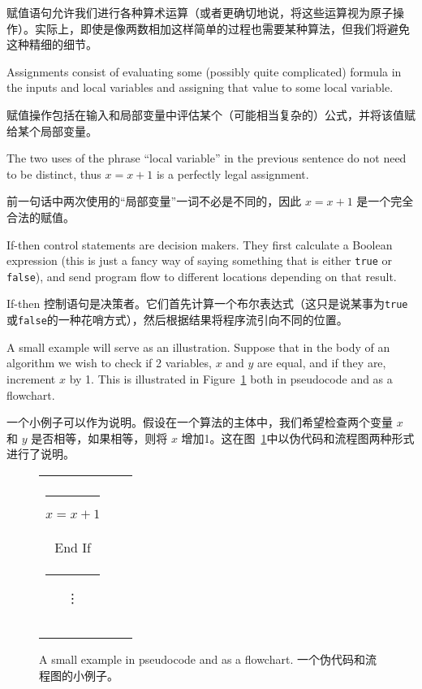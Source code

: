 赋值语句允许我们进行各种算术运算（或者更确切地说，将这些运算视为原子操作）。实际上，即使是像两数相加这样简单的过程也需要某种算法，但我们将避免这种精细的细节。

Assignments consist of evaluating some (possibly quite
complicated) formula in the inputs and local variables and assigning
that value to some local variable.

赋值操作包括在输入和局部变量中评估某个（可能相当复杂的）公式，并将该值赋给某个局部变量。

The two uses of the phrase ``local
variable''  in the previous sentence do not need to be distinct, thus
$x = x + 1$ is a perfectly legal assignment.

前一句话中两次使用的“局部变量”一词不必是不同的，因此 $x = x + 1$ 是一个完全合法的赋值。

If-then control statements are decision makers.  They first calculate
a Boolean expression (this is just a fancy way of saying something
that is either {\tt true} or {\tt false}), and send program flow to 
different locations depending on that result.

If-then 控制语句是决策者。它们首先计算一个布尔表达式（这只是说某事为{\tt true}或{\tt false}的一种花哨方式），然后根据结果将程序流引向不同的位置。

A small example will
serve as an illustration.  Suppose that in the body of an algorithm we
wish to check if 2 variables, $x$ and $y$ are equal, and if they are,
increment $x$ by 1.  This is illustrated in Figure~\ref{fig:if-then}
both in pseudocode and as a flowchart.

一个小例子可以作为说明。假设在一个算法的主体中，我们希望检查两个变量 $x$ 和 $y$ 是否相等，如果相等，则将 $x$ 增加1。这在图~\ref{fig:if-then}中以伪代码和流程图两种形式进行了说明。

\begin{figure}[!hbt] 
\begin{tabular}{ccc} 
 
 & \hspace{1in} &
\begin{minipage}[b]{.3\textwidth}
\tt If $x=y$ then \\
\rule{15pt}{0pt}  $x=x+1$ \\
End If \\
\rule{30pt}{0pt} \vdots\\
\\
\\
\end{minipage} \\
\end{tabular}
\caption{A small example in pseudocode and as a flowchart. 一个伪代码和流程图的小例子。}
\label{fig:if-then}
\end{figure}

